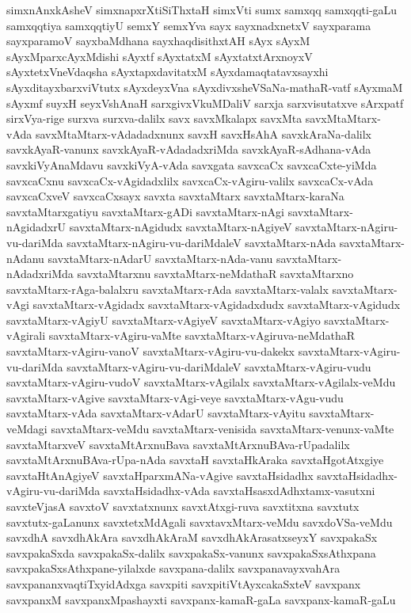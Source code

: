 {simxnAnxkAsheV
simxnapxrXtiSiThxtaH
simxVti
sumx
samxqq
samxqqti-gaLu
samxqqtiya
samxqqtiyU
semxY
semxYva
sayx
sayxnadxnetxV
sayxparama
sayxparamoV
sayxbaMdhana
sayxhaqdisithxtAH
sAyx
sAyxM
sAyxMparxcAyxMdishi
sAyxtf
sAyxtatxM
sAyxtatxtArxnoyxV
sAyxtetxVneVdaqsha
sAyxtapxdavitatxM
sAyxdamaqtatavxsayxhi
sAyxditayxbarxviVtutx
sAyxdeyxVna
sAyxdivxsheVSaNa-mathaR-vatf
sAyxmaM
sAyxmf
suyxH
seyxVshAnaH
sarxgivxVkuMDaliV
sarxja
sarxvisutatxve
sArxpatf
sirxVya-rige
surxva
surxva-dalilx
savx
savxMkalapx
savxMta
savxMtaMtarx-vAda
savxMtaMtarx-vAdadadxnunx
savxH
savxHsAhA
savxkAraNa-dalilx
savxkAyaR-vanunx
savxkAyaR-vAdadadxriMda
savxkAyaR-sAdhana-vAda
savxkiVyAnaMdavu
savxkiVyA-vAda
savxgata
savxcaCx
savxcaCxte-yiMda
savxcaCxnu
savxcaCx-vAgidadxlilx
savxcaCx-vAgiru-valilx
savxcaCx-vAda
savxcaCxveV
savxcaCxsayx
savxta
savxtaMtarx
savxtaMtarx-karaNa
savxtaMtarxgatiyu
savxtaMtarx-gADi
savxtaMtarx-nAgi
savxtaMtarx-nAgidadxrU
savxtaMtarx-nAgidudx
savxtaMtarx-nAgiyeV
savxtaMtarx-nAgiru-vu-dariMda
savxtaMtarx-nAgiru-vu-dariMdaleV
savxtaMtarx-nAda
savxtaMtarx-nAdanu
savxtaMtarx-nAdarU
savxtaMtarx-nAda-vanu
savxtaMtarx-nAdadxriMda
savxtaMtarxnu
savxtaMtarx-neMdathaR
savxtaMtarxno
savxtaMtarx-rAga-balalxru
savxtaMtarx-rAda
savxtaMtarx-valalx
savxtaMtarx-vAgi
savxtaMtarx-vAgidadx
savxtaMtarx-vAgidadxdudx
savxtaMtarx-vAgidudx
savxtaMtarx-vAgiyU
savxtaMtarx-vAgiyeV
savxtaMtarx-vAgiyo
savxtaMtarx-vAgirali
savxtaMtarx-vAgiru-vaMte
savxtaMtarx-vAgiruva-neMdathaR
savxtaMtarx-vAgiru-vanoV
savxtaMtarx-vAgiru-vu-dakekx
savxtaMtarx-vAgiru-vu-dariMda
savxtaMtarx-vAgiru-vu-dariMdaleV
savxtaMtarx-vAgiru-vudu
savxtaMtarx-vAgiru-vudoV
savxtaMtarx-vAgilalx
savxtaMtarx-vAgilalx-veMdu
savxtaMtarx-vAgive
savxtaMtarx-vAgi-veye
savxtaMtarx-vAgu-vudu
savxtaMtarx-vAda
savxtaMtarx-vAdarU
savxtaMtarx-vAyitu
savxtaMtarx-veMdagi
savxtaMtarx-veMdu
savxtaMtarx-venisida
savxtaMtarx-venunx-vaMte
savxtaMtarxveV
savxtaMtArxnuBava
savxtaMtArxnuBAva-rUpadalilx
savxtaMtArxnuBAva-rUpa-nAda
savxtaH
savxtaHkAraka
savxtaHgotAtxgiye
savxtaHtAnAgiyeV
savxtaHparxmANa-vAgive
savxtaHsidadhx
savxtaHsidadhx-vAgiru-vu-dariMda
savxtaHsidadhx-vAda
savxtaHsasxdAdhxtamx-vasutxni
savxteVjasA
savxtoV
savxtatxnunx
savxtAtxgi-ruva
savxtitxna
savxtutx
savxtutx-gaLanunx
savxtetxMdAgali
savxtavxMtarx-veMdu
savxdoVSa-veMdu
savxdhA
savxdhAkAra
savxdhAkAraM
savxdhAkArasatxseyxY
savxpakaSx
savxpakaSxda
savxpakaSx-dalilx
savxpakaSx-vanunx
savxpakaSxsAthxpana
savxpakaSxsAthxpane-yilalxde
savxpana-dalilx
savxpanavayxvahAra
savxpananxvaqtiTxyidAdxga
savxpiti
savxpitiVtAyxcakaSxteV
savxpanx
savxpanxM
savxpanxMpashayxti
savxpanx-kamaR-gaLa
savxpanx-kamaR-gaLu
}
